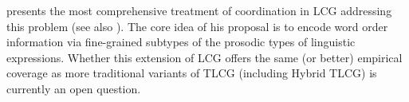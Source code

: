 \documentclass[output=paper]{langsci/langscibook}
\begin{document}
\citet{worth-diss} presents the most comprehensive treatment of coordination
in LCG addressing this problem (see also \citet{kanazawa15}). The core idea
of his proposal is to encode word order information via fine-grained
subtypes of the prosodic types of linguistic expressions. Whether this
extension of LCG offers the same (or better) empirical coverage as
more traditional variants of TLCG (including Hybrid TLCG) is currently an open
question.






\end{document}
